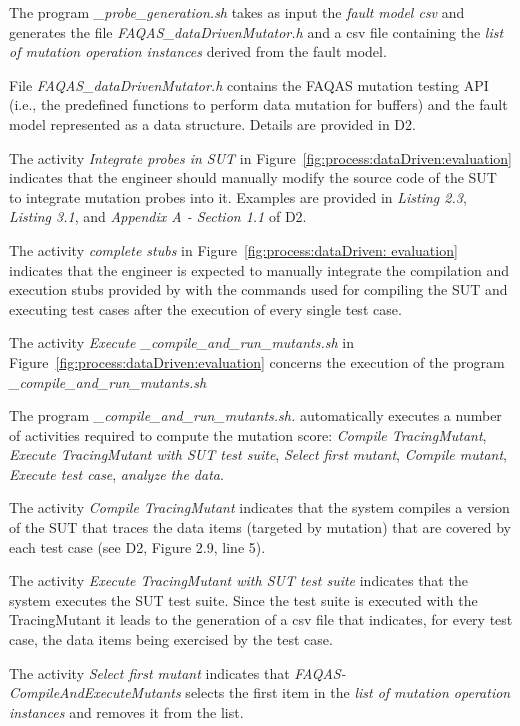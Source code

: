 The program \emph{\dama\_probe\_generation.sh} takes as input the \emph{fault model csv} and generates the file \emph{FAQAS\_dataDrivenMutator.h} and a csv file containing the \emph{list of mutation operation instances} derived from the fault model.

File \emph{FAQAS\_dataDrivenMutator.h} contains the FAQAS mutation testing API (i.e., the predefined functions to perform data mutation for buffers) and the fault model represented as a data structure. Details are provided in D2.

The activity \emph{Integrate probes in SUT} in Figure~\ref{fig:process:dataDriven:evaluation} indicates that the engineer should manually modify the source code of the SUT to integrate mutation probes into it. Examples are provided in \emph{Listing 2.3}, \emph{Listing 3.1}, and \emph{Appendix A - Section 1.1} of D2.

The activity \emph{complete \dama stubs} in Figure~\ref{fig:process:dataDriven: evaluation} indicates that the engineer is expected to manually integrate the compilation and execution stubs provided by \dama with the commands used for compiling the SUT and executing test cases after the execution of every single test case.

The activity \emph{Execute \dama\_compile\_and\_run\_mutants.sh} in Figure~\ref{fig:process:dataDriven:evaluation} concerns the execution of the program \emph{\dama\_compile\_and\_run\_mutants.sh}

The program \emph{\dama\_compile\_and\_run\_mutants.sh.} automatically executes a number of activities required to compute the mutation score: \emph{Compile TracingMutant}, \emph{Execute TracingMutant with SUT test suite}, \emph{Select first mutant}, \emph{Compile mutant}, \emph{Execute test case},  \emph{analyze the data}.

The activity \emph{Compile TracingMutant} indicates that the system compiles a version of the SUT that traces the data items (targeted by mutation) that are covered by each test case (see D2, Figure 2.9, line 5).

The activity \emph{Execute TracingMutant with SUT test suite} indicates that the system executes the SUT test suite. Since the test suite is executed with the TracingMutant it leads to the generation of a csv file that indicates, for every test case, the data items being exercised by the test case.

The activity \emph{Select first mutant} indicates that  \emph{FAQAS-CompileAndExecuteMutants} selects the first item in the \emph{list of mutation operation instances} and removes it from the list.

